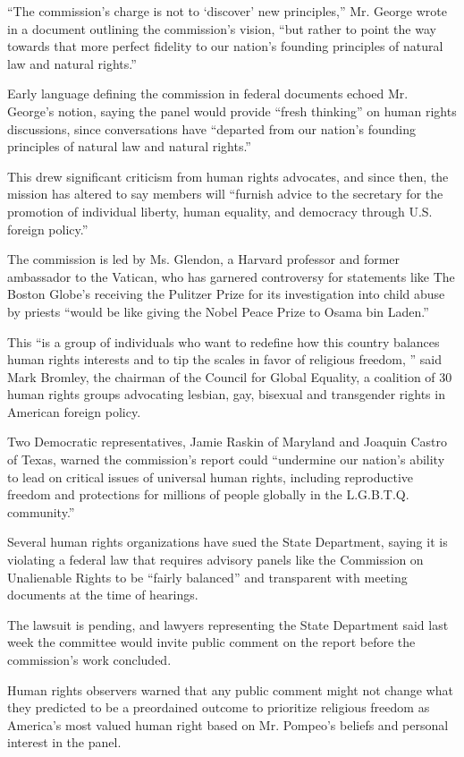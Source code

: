 ``The commission's charge is not to `discover' new principles,'' Mr.
George wrote in a document outlining the commission's vision, ``but
rather to point the way towards that more perfect fidelity to our
nation's founding principles of natural law and natural rights.''

Early language defining the commission in federal documents echoed Mr.
George's notion, saying the panel would provide ``fresh thinking'' on
human rights discussions, since conversations have ``departed from our
nation's founding principles of natural law and natural rights.''

This drew significant criticism from human rights advocates, and since
then, the mission has altered to say members will ``furnish advice to
the secretary for the promotion of individual liberty, human equality,
and democracy through U.S. foreign policy.''

The commission is led by Ms. Glendon, a Harvard professor and former
ambassador to the Vatican, who has garnered controversy for statements
like The Boston Globe's receiving the Pulitzer Prize for its
investigation into child abuse by priests ``would be like giving the
Nobel Peace Prize to Osama bin Laden.''

This ``is a group of individuals who want to redefine how this country
balances human rights interests and to tip the scales in favor of
religious freedom, '' said Mark Bromley, the chairman of the Council for
Global Equality, a coalition of 30 human rights groups advocating
lesbian, gay, bisexual and transgender rights in American foreign
policy.

Two Democratic representatives, Jamie Raskin of Maryland and Joaquin
Castro of Texas, warned the commission's report could ``undermine our
nation's ability to lead on critical issues of universal human rights,
including reproductive freedom and protections for millions of people
globally in the L.G.B.T.Q. community.''

Several human rights organizations have sued the State Department,
saying it is violating a federal law that requires advisory panels like
the Commission on Unalienable Rights to be ``fairly balanced'' and
transparent with meeting documents at the time of hearings.

The lawsuit is pending, and lawyers representing the State Department
said last week the committee would invite public comment on the report
before the commission's work concluded.

Human rights observers warned that any public comment might not change
what they predicted to be a preordained outcome to prioritize religious
freedom as America's most valued human right based on Mr. Pompeo's
beliefs and personal interest in the panel.

